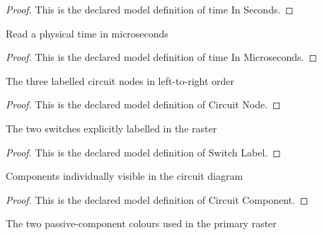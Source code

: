 \begin{proof}
  This is the declared model definition of time In Seconds.
\end{proof}
\begin{definition}
  \label{def:physics:phyx-mini-0941:phyxminiproblems-problemphyxmini0941-timeinmicroseconds}
  Read a physical time in microseconds
\end{definition}
\begin{proof}
  This is the declared model definition of time In Microseconds.
\end{proof}
\begin{definition}
  \label{def:physics:phyx-mini-0941:phyxminiproblems-problemphyxmini0941-circuitnode}
  The three labelled circuit nodes in left-to-right order
\end{definition}
\begin{proof}
  This is the declared model definition of Circuit Node.
\end{proof}
\begin{definition}
  \label{def:physics:phyx-mini-0941:phyxminiproblems-problemphyxmini0941-switchlabel}
  The two switches explicitly labelled in the raster
\end{definition}
\begin{proof}
  This is the declared model definition of Switch Label.
\end{proof}
\begin{definition}
  \label{def:physics:phyx-mini-0941:phyxminiproblems-problemphyxmini0941-circuitcomponent}
  Components individually visible in the circuit diagram
\end{definition}
\begin{proof}
  This is the declared model definition of Circuit Component.
\end{proof}
\begin{definition}
  \label{def:physics:phyx-mini-0941:phyxminiproblems-problemphyxmini0941-componentcolor}
  The two passive-component colours used in the primary raster
\end{definition}
